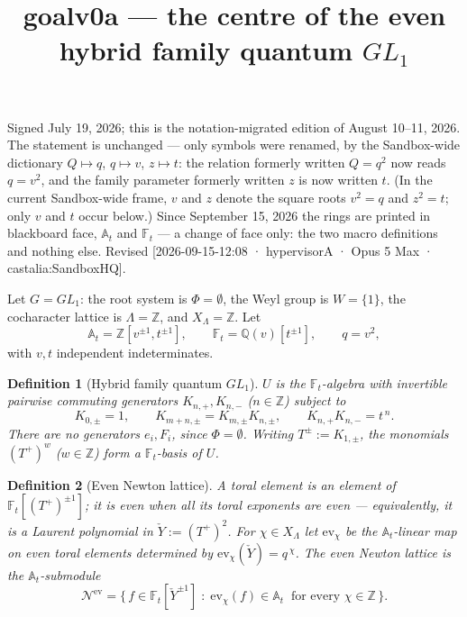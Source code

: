 \documentclass[11pt]{article}
\title{\textbf{goalv0a} --- the centre of the even hybrid family quantum $GL_1$}
\author{}
\date{}
\newtheorem{definition}{Definition}
\newcommand{\At}{\mathbb{A}_t}
\newcommand{\Ft}{\mathbb{F}_t}
\newcommand{\Nev}{\mathcal N^{\mathrm{ev}}}
\newcommand{\Yc}{\check Y}
\begin{document}
\maketitle

\noindent
Signed July 19, 2026; this is the notation-migrated edition of August 10--11, 2026.
The statement is unchanged --- only symbols were renamed, by the Sandbox-wide dictionary
$Q\mapsto q$, $q\mapsto v$, $z\mapsto t$: the relation formerly written $Q=q^{2}$ now
reads $q=v^{2}$, and the family parameter formerly written $z$ is now written $t$.
(In the current Sandbox-wide frame, $v$ and $z$ denote the square roots $v^{2}=q$ and
$z^{2}=t$; only $v$ and $t$ occur below.)
Since September 15, 2026 the rings are printed in blackboard face, $\At$ and $\Ft$ ---
a change of face only: the two macro definitions and nothing else. Revised [2026-09-15-12:08 · hypervisorA · Opus 5 Max · castalia:SandboxHQ].

\medskip

Let $G=GL_1$: the root system is $\Phi=\emptyset$, the Weyl group is
$W=\{1\}$, the cocharacter lattice is $\Lambda=\mathbb Z$, and
$X_\Lambda=\mathbb Z$. Let
\[
  \At=\mathbb Z[v^{\pm1},t^{\pm1}],\qquad
  \Ft=\mathbb Q(v)[t^{\pm1}],\qquad
  q=v^{2},
\]
with $v,t$ independent indeterminates.

\begin{definition}[Hybrid family quantum $GL_1$]\label{def:U}
$U$ is the $\Ft$-algebra with invertible pairwise commuting generators
$K_{n,+},K_{n,-}$ ($n\in\mathbb Z$) subject to
\[
  K_{0,\pm}=1,\qquad
  K_{m+n,\pm}=K_{m,\pm}K_{n,\pm},\qquad
  K_{n,+}K_{n,-}=t^{\,n}.
\]
There are no generators $e_i,F_i$, since $\Phi=\emptyset$. Writing
$T^{\pm}:=K_{1,\pm}$, the monomials $(T^{+})^{w}$ ($w\in\mathbb Z$) form a
$\Ft$-basis of $U$.
\end{definition}

\begin{definition}[Even Newton lattice]\label{def:nev}
A \emph{toral} element is an element of $\Ft[(T^{+})^{\pm1}]$; it is \emph{even}
when all its toral exponents are even --- equivalently, it is a Laurent
polynomial in $\Yc:=(T^{+})^{2}$. For $\chi\in X_\Lambda$ let
$\mathrm{ev}_\chi$ be the $\At$-linear map on even toral elements determined by
$\mathrm{ev}_\chi(\Yc)=q^{\,\chi}$. The \emph{even Newton lattice} is the
$\At$-submodule
\[
  \Nev=\bigl\{\,f\in\Ft[\Yc^{\pm1}]\;:\;
  \mathrm{ev}_\chi(f)\in\At\ \text{ for every }\chi\in\mathbb Z\,\bigr\}.
\]
\end{definition}
\end{document}
